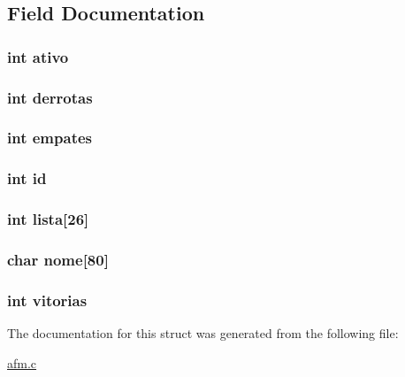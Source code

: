 \subsection{\-Field \-Documentation}
\hypertarget{structequipa_a5bc3bc4334890083c1af35103dae7964}{
\subsubsection[{ativo}]{\setlength{\rightskip}{0pt plus 5cm}int {\bf ativo}}}\label{structequipa_a5bc3bc4334890083c1af35103dae7964}
\hypertarget{structequipa_aec0b9c1802275e055b4245b4d74e6733}{
\subsubsection[{derrotas}]{\setlength{\rightskip}{0pt plus 5cm}int {\bf derrotas}}}\label{structequipa_aec0b9c1802275e055b4245b4d74e6733}
\hypertarget{structequipa_a4ea65a038afceee592fe0b4a9eeebf98}{
\subsubsection[{empates}]{\setlength{\rightskip}{0pt plus 5cm}int {\bf empates}}}\label{structequipa_a4ea65a038afceee592fe0b4a9eeebf98}
\hypertarget{structequipa_a7441ef0865bcb3db9b8064dd7375c1ea}{
\subsubsection[{id}]{\setlength{\rightskip}{0pt plus 5cm}int {\bf id}}}\label{structequipa_a7441ef0865bcb3db9b8064dd7375c1ea}
\hypertarget{structequipa_ae4169594b69b603d4d756c4b127b58ec}{
\subsubsection[{lista}]{\setlength{\rightskip}{0pt plus 5cm}int {\bf lista}\mbox{[}26\mbox{]}}}\label{structequipa_ae4169594b69b603d4d756c4b127b58ec}
\hypertarget{structequipa_a2fe8d29936547b4ede632f419ea32367}{
\subsubsection[{nome}]{\setlength{\rightskip}{0pt plus 5cm}char {\bf nome}\mbox{[}80\mbox{]}}}\label{structequipa_a2fe8d29936547b4ede632f419ea32367}
\hypertarget{structequipa_a1fe4593c9060bf2d8f69a78b9af1f60b}{
\subsubsection[{vitorias}]{\setlength{\rightskip}{0pt plus 5cm}int {\bf vitorias}}}\label{structequipa_a1fe4593c9060bf2d8f69a78b9af1f60b}


\-The documentation for this struct was generated from the following file\-:\begin{DoxyCompactItemize}
\item 
\hyperlink{afm_8c}{afm.\-c}\end{DoxyCompactItemize}
